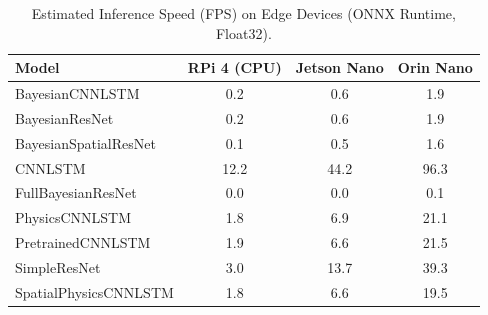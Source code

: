 
\begin{table}[h]
\centering
\caption{Estimated Inference Speed (FPS) on Edge Devices (ONNX Runtime, Float32).}
\label{tab:edge_fps}
\begin{tabular*}{\linewidth}{@{\extracolsep{\fill}}lccc}
\hline
\textbf{Model} & \textbf{RPi 4 (CPU)} & \textbf{Jetson Nano} & \textbf{Orin Nano} \\
\hline
BayesianCNNLSTM & 0.2 & 0.6 & 1.9 \\
BayesianResNet & 0.2 & 0.6 & 1.9 \\
BayesianSpatialResNet & 0.1 & 0.5 & 1.6 \\
CNNLSTM & 12.2 & 44.2 & 96.3 \\
FullBayesianResNet & 0.0 & 0.0 & 0.1 \\
PhysicsCNNLSTM & 1.8 & 6.9 & 21.1 \\
PretrainedCNNLSTM & 1.9 & 6.6 & 21.5 \\
SimpleResNet & 3.0 & 13.7 & 39.3 \\
SpatialPhysicsCNNLSTM & 1.8 & 6.6 & 19.5 \\
\hline
\end{tabular*}
\end{table}
